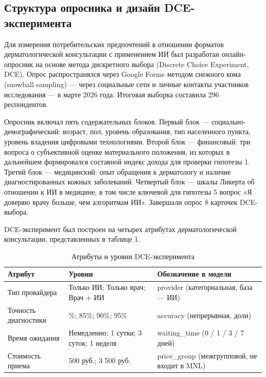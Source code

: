 \documentclass[12pt, a4paper]{article}
\begin{document}
\subsection{Структура опросника и дизайн DCE-эксперимента}
Для измерения потребительских предпочтений в отношении форматов дерматологической консультации с применением ИИ был разработан онлайн-опросник на основе метода дискретного выбора (Discrete Choice Experiment, DCE). Опрос распространялся через Google Forms методом снежного кома (snowball sampling) — через социальные сети и личные контакты участников исследования — в марте 2026 года. Итоговая выборка составила 296 респондентов.

Опросник включал пять содержательных блоков. Первый блок — социально-демографический: возраст, пол, уровень образования, тип населенного пункта, уровень владения цифровыми технологиями. Второй блок — финансовый: три вопроса о субъективной оценке материального положения, из которых в дальнейшем формировался составной индекс дохода для проверки гипотезы 1. Третий блок — медицинский: опыт обращения к дерматологу и наличие диагностированных кожных заболеваний. Четвертый блок — шкалы Ликерта об отношении к ИИ в медицине, в том числе ключевой для гипотезы 5 вопрос «Я доверяю врачу больше, чем алгоритмам ИИ». Завершали опрос 8 карточек DCE-выбора.

DCE-эксперимент был построен на четырех атрибутах дерматологической консультации, представленных в таблице 1.

\begin{table}[h]
\centering
\caption{Атрибуты и уровни DCE-эксперимента}
\label{tab:attributes}
\small
\begin{tabularx}{\textwidth}{l>{\raggedright\arraybackslash}X>{\raggedright\arraybackslash}X}
\toprule
\textbf{Атрибут} & \textbf{Уровни} & \textbf{Обозначение в модели} \\
\midrule
Тип провайдера & Только ИИ; Только врач; Врач + ИИ & provider (категориальная, база --- ИИ) \\
Точность диагностики & 80\%; 85\%; 90\%; 95\% & accuracy (непрерывная, доли) \\
Время ожидания & Немедленно; 1 сутки; 3 суток; 1 неделя & waiting\_time (0 / 1 / 3 / 7 дней) \\
Стоимость приема & 1 500 руб.; 3 500 руб. & price\_group (межгрупповой, не входит в MNL) \\
\bottomrule
\end{tabularx}
\end{table}
\end{document}
